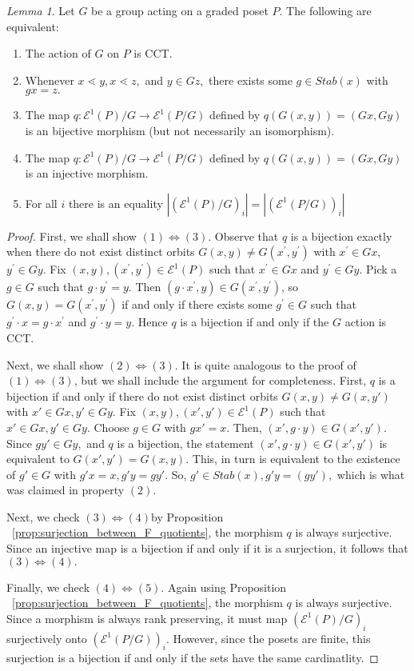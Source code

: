 \documentclass[10 pt]{amsart}
\theoremstyle{plain}
\theoremstyle{definition}
\theoremstyle{remark}
\numberwithin{equation}{section}
\newtheorem{lem}[thm]{Lemma}
\theoremstyle{remark}
\renewcommand{\iff}{\Leftrightarrow}
\begin{document}
\begin{lem}
\label{lem:cover_transitive_equivalence}
Let $G$ be a group acting on a graded poset $P.$ The following are equivalent:
\begin{enumerate}
	\item The action of $G$ on $P$ is CCT.
	\item Whenever $x \lessdot y,x \lessdot z,$ and $y \in Gz,$ there exists some $g \in Stab(x)$ with $gx = z.$
	\item The map $q\colon \mathcal E^1(P)/G\rightarrow \mathcal E^1(P/G)$ defined by $q(G(x, y)) = (Gx,Gy)$ is an bijective morphism (but not necessarily an isomorphism).
	\item The map $q\colon \mathcal E^1(P)/G\rightarrow \mathcal E^1(P/G)$ defined by $q(G(x, y)) = (Gx,Gy)$ is an injective morphism.
	\item For all $i$ there is an equality $|(\mathcal E^1(P)/G)_i|=| (\mathcal E^1(P/G))_i|$
\end{enumerate}
\end{lem}
\begin{proof}
First, we shall show $(1) \iff (3)$. Observe that $q$ is a bijection exactly when there do not exist distinct orbits $G(x, y) \ne G(x^\prime, y^\prime)$ with $x^\prime\in Gx$, $y^\prime\in Gy$.  Fix $(x, y), (x^\prime, y^\prime)\in \mathcal E^1(P)$ such that $x^\prime\in Gx$ and $y^\prime\in Gy$.  Pick a $g\in G$ such that $g\cdot y^\prime = y$.  Then $(g\cdot x^\prime, y)\in G(x^\prime, y^\prime)$, so $G(x, y) = G(x^\prime, y^\prime)$ if and only if there exists some $g^\prime\in G$ such that $g^\prime\cdot x = g\cdot x^\prime$ and $g^\prime\cdot y = y$. Hence $q$ is a bijection if and only if the $G$ action is CCT.

Next, we shall show $(2) \iff (3)$. It is quite analogous to the proof of $(1) \iff (3)$, but we shall include the argument for completeness. 
First, $q$ is a bijection if and only if there do not exist distinct orbits $G(x, y) \neq G(x, y')$ with $x' \in Gx,y'\in Gy.$ Fix $(x, y),(x', y') \in \mathcal E^1(P)$ such that $x' \in Gx,y'\in Gy$. Choose $g \in G$ with $gx' = x.$ Then, $(x', g\cdot y) \in G(x', y').$ Since $g y' \in Gy,$ and $q$ is a bijection, the statement $(x' , g\cdot y) \in G(x', y')$ is equivalent to $G(x', y') = G(x, y).$ This, in turn is equivalent to the existence of $g' \in G$ with $g'x = x,g'y = gy'.$ So, $g' \in Stab(x),g'y = (gy'),$ which is what was claimed in property $(2)$.

Next, we check $(3) \iff (4)$by Proposition ~\ref{prop:surjection_between_F_quotients}, the morphism $q$ is always surjective. Since an injective map is a bijection if and only if it is a surjection, it follows that $(3) \iff (4).$

Finally, we check $(4)\iff (5).$ Again using Proposition ~\ref{prop:surjection_between_F_quotients}, the morphism $q$ is always surjective. Since a morphism is always rank preserving, it must map $(\mathcal E^1(P)/G)_i$ surjectively onto $(\mathcal E^1(P/G))_i.$ However, since the posets are finite, this surjection is a bijection if and only if the sets have the same cardinatlity.
\end{proof}
\end{document}
